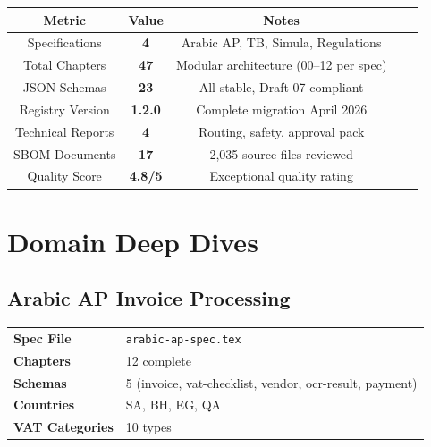 \documentclass[11pt,a4paper]{report}
\begin{document}
\begin{center}
\begin{tabularx}{0.95\textwidth}{@{}>{}Sc >{}Sc X@{}}
\toprule
\textbf{Metric} & \textbf{Value} & \textbf{Notes} \\
\midrule
Specifications & \textbf{4} & Arabic AP, TB, Simula, Regulations \\
Total Chapters & \textbf{47} & Modular architecture (00--12 per spec) \\
JSON Schemas & \textbf{23} & All stable, Draft-07 compliant \\
Registry Version & \textbf{1.2.0} & Complete migration April 2026 \\
Technical Reports & \textbf{4} & Routing, safety, approval pack \\
SBOM Documents & \textbf{17} & 2,035 source files reviewed \\
Quality Score & \textbf{4.8/5} & Exceptional quality rating \\
\bottomrule
\end{tabularx}
\end{center}

\chapter{Domain Deep Dives}

\section{Arabic AP Invoice Processing}

\begin{mdframed}[style=domainbox,linecolor=arabiccolor,linewidth=2pt]
\begin{minipage}[t]{0.65\textwidth}
\begin{tabularx}{\textwidth}{@{}l X@{}}
\textbf{Spec File} & \texttt{arabic-ap-spec.tex} \\
\textbf{Chapters} & 12 complete \\
\textbf{Schemas} & 5 (invoice, vat-checklist, vendor, ocr-result, payment) \\
\textbf{Countries} & SA, BH, EG, QA \\
\textbf{VAT Categories} & 10 types \\
\end{tabularx}
\end{minipage}
\hfill
\begin{minipage}[t]{0.3\textwidth}
\begin{center}
\end{center}
\end{minipage}
\end{mdframed}
\end{document}
